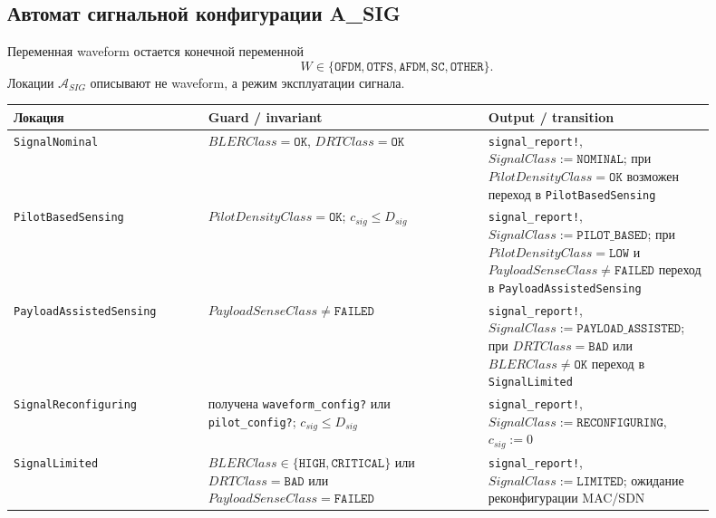 \documentclass[10pt,a4paper]{article}
\newcommand{\code}[1]{\texttt{#1}}
\newcommand{\A}[1]{\mathcal{A}_{#1}}
\begin{document}
\subsection{Автомат сигнальной конфигурации A\_SIG}

Переменная waveform остается конечной переменной
\begin{equation}
W\in\{\code{OFDM},\code{OTFS},\code{AFDM},\code{SC},\code{OTHER}\}.
\end{equation}
Локации \(\A{SIG}\) описывают не waveform, а режим эксплуатации сигнала.

\begin{longtable}{|p{0.25\linewidth}|p{0.36\linewidth}|p{0.29\linewidth}|}
\hline
Локация & Guard / invariant & Output / transition \\
\hline
\code{SignalNominal} & \(BLERClass=\code{OK}\), \(DRTClass=\code{OK}\) & \code{signal\_report!}, \(SignalClass:=\code{NOMINAL}\); при \(PilotDensityClass=\code{OK}\) возможен переход в \code{PilotBasedSensing} \\
\hline
\code{PilotBasedSensing} & \(PilotDensityClass=\code{OK}\); \(c_{sig}\le D_{sig}\) & \code{signal\_report!}, \(SignalClass:=\code{PILOT\_BASED}\); при \(PilotDensityClass=\code{LOW}\) и \(PayloadSenseClass\ne\code{FAILED}\) переход в \code{PayloadAssistedSensing} \\
\hline
\code{Payload}\-\code{Assisted}\-\code{Sensing} & \(PayloadSenseClass\ne\code{FAILED}\) & \code{signal\_report!}, \(SignalClass:=\code{PAYLOAD\_ASSISTED}\); при \(DRTClass=\code{BAD}\) или \(BLERClass\ne\code{OK}\) переход в \code{SignalLimited} \\
\hline
\code{SignalReconfiguring} & получена \code{waveform\_config?} или \code{pilot\_config?}; \(c_{sig}\le D_{sig}\) & \code{signal\_report!}, \(SignalClass:=\code{RECONFIGURING}\), \(c_{sig}:=0\) \\
\hline
\code{SignalLimited} & \(BLERClass\in\{\code{HIGH},\code{CRITICAL}\}\) или \(DRTClass=\code{BAD}\) или \(PayloadSenseClass=\code{FAILED}\) & \code{signal\_report!}, \(SignalClass:=\code{LIMITED}\); ожидание реконфигурации MAC/SDN \\
\hline
\end{longtable}
\end{document}
